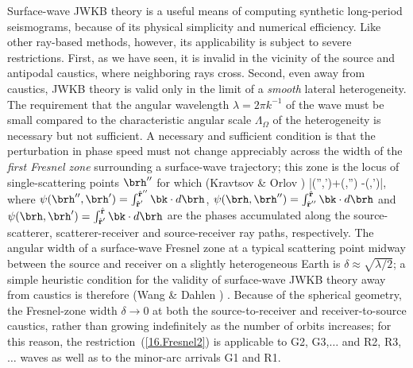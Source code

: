Surface-wave JWKB theory is a useful means of computing
synthetic long-period seismograms, because of its
physical simplicity and numerical efficiency.
Like other ray-based methods, however, its
applicability is subject to severe restrictions.
First, as we have seen, it is invalid
in the vicinity of the source and antipodal
caustics, where neighboring rays cross.
Second, even away from caustics, JWKB theory
is valid only in the limit of a {\em smooth\/}
lateral heterogeneity.  The requirement that the
angular wavelength $\lambda =2\pi k^{-1}$ of the wave must be
small compared to the characteristic angular scale
$\Lambda_{\Omega}$ of the heterogeneity is necessary but not
sufficient.  A necessary and sufficient condition
is that the perturbation in phase speed must not change
appreciably across the width of the {\em first Fresnel
zone\/} surrounding a surface-wave trajectory;
%
this zone is the locus of single-scattering
points $\brh''$
for which (Kravtsov \& Orlov \citeyear{kravtsov&orlov90})
\eq \label{16.Fresnel1}
|\psi(\brh'',\brh')+\psi(\brh,\brh'')
-\psi(\brh,\brh')|\leq\pi,
\en
where $\psi(\brh'',\brh')=\int_{\hat{\mbox{\scriptsize\bf r}}'}
^{\hat{\mbox{\scriptsize\bf r}}''}\bk\cdot d\brh$,
$\psi(\brh,\brh'')=\int_{\hat{\mbox{\scriptsize\bf r}}''}
^{\hat{\mbox{\scriptsize\bf r}}}\bk\cdot d\brh$
and $\psi(\brh,\brh')=\int_{\hat{\mbox{\scriptsize\bf r}}'}
^{\hat{\mbox{\scriptsize\bf r}}}\bk\cdot d\brh$ are the
phases accumulated along the source-scatterer,
scatterer-receiver and source-receiver ray paths, respectively.
The angular width of a surface-wave Fresnel zone
at a typical scattering point
midway between the source and receiver on a
slightly heterogeneous Earth is $\delta\approx\sqrt{\lambda/2}$;
a simple heuristic condition for the validity of surface-wave
JWKB theory away from caustics is therefore
(Wang \& Dahlen \citeyear{wang&dahlen95})
\eq \label{16.Fresnel2}
.
\en
Because of the spherical geometry, the Fresnel-zone
width $\delta\rightarrow 0$ at both the source-to-receiver
and receiver-to-source caustics, rather than growing
indefinitely as the number of orbits increases;
for this reason, the restriction~(\ref{16.Fresnel2})
is applicable to G2, G3,\hspace{0.2mm}$\ldots$ and R2, R3,\hspace{0.2mm}$\ldots$
waves as well as to the minor-arc arrivals G1 and R1.

